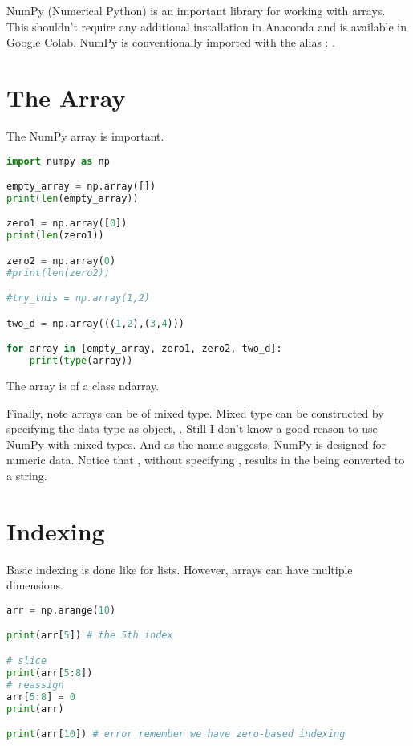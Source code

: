 

\smallskip

NumPy (Numerical Python) is an important library for working with arrays. This shouldn't require any additional installation in Anaconda and is available in Google Colab. NumPy is conventionally imported with the alias : .

\section{The Array}
\noindent The NumPy array is important. 

\begin{lstlisting}[language = Python]
import numpy as np

empty_array = np.array([])
print(len(empty_array))

zero1 = np.array([0])
print(len(zero1))

zero2 = np.array(0)
#print(len(zero2))

#try_this = np.array(1,2)

two_d = np.array(((1,2),(3,4)))

for array in [empty_array, zero1, zero2, two_d]:
    print(type(array))
\end{lstlisting}

The array is of a class ndarray. 

Finally, note arrays can be of mixed type. Mixed type can be constructed by specifying the data type as object, . Still I don't know a good reason to use NumPy with mixed types. And as the name suggests, NumPy is designed for numeric data. Notice that , without specifying , results in the  being converted to a string. 

\section{Indexing}
Basic indexing is done like for lists. However, arrays can have multiple dimensions.

\begin{lstlisting}[language = Python]
arr = np.arange(10)

print(arr[5]) # the 5th index

# slice
print(arr[5:8])
# reassign
arr[5:8] = 0
print(arr)

print(arr[10]) # error remember we have zero-based indexing
\end{lstlisting}

